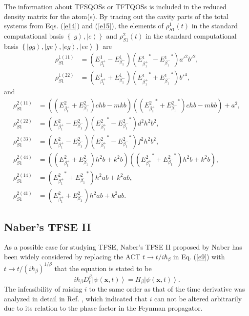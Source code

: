 \documentclass[
showpacs,  %
showkeys,  %
aps,       %
amsthm,    %
amsmath,   %
amsfonts,  %
amssymb    %
]{revtex4-1}          %
\begin{document}
The information about TFSQOSs or TFTQOSs is included in the reduced density matrix for the atom(s). By tracing out the cavity parts of the total systems from Eqs. (\ref{e14}) and (\ref{e15}), the elements of ${\rho^1_{S1}(t)}$ in the standard computational basis $\left\{{\left|g\right\rangle,\left|e\right\rangle}\right\}$ and ${\rho^2_{S1}(t)}$ in the standard computational basis $\left\{ {\left|{gg}\right\rangle,\left|{ge}\right\rangle,\left|{eg} \right\rangle,\left|{ee}\right\rangle}\right\}$ are
\begin{equation}
\label{e17}
\begin{aligned}
{\rho_{S1}^{1(11)}} &= (E_{\beta_1^ + }^1 - E_{\beta_1^ - }^1)({E{_{\beta _1^ + }^1}^*} - {E{_{\beta _1^ - }^1}^*}){a'}^2{b'}^2,\\
{\rho_{S1}^{1(22)}} &= (E_{\beta_1^ + }^1 + E_{\beta_1^ - }^1)({E{_{\beta _1^ + }^1}^*} + {E{_{\beta _1^ - }^1}^*}){b'}^4,
\end{aligned}
\end{equation}
and
\begin{equation}
\label{e18}
\begin{aligned}
{\rho_{S1}^{2(11)}}&=(({E_{\beta_1^ +}^2}+{E_{\beta_1^ -}^2})chb-mkb)(({{E_{\beta_1^ + }^2}^*} + {{E_{\beta_1^ - }^2}^*})chb-mkb)+ {a^2},\\
{\rho_{S1}^{2(22)}}&=({E_{\beta_1^ +}^2}-{E_{\beta_1^ -}^2})({{E_{\beta_1^ + }^2}^*} - {{E_{\beta_1^ - }^2}^*}){d^2}{h^2}{b^2},\\
{\rho_{S1}^{2(33)}}&=({E_{\beta_1^ +}^2}-{E_{\beta_1^ -}^2})({{E_{\beta_1^ + }^2}^*} - {{E_{\beta_1^ - }^2}^*}){f^2}{h^2}{b^2},\\
{\rho_{S1}^{2(44)}}&=(({E_{\beta_1^ +}^2}+{E_{\beta_1^ -}^2}){h^2}b+{k^2}b)(({{E_{\beta_1^ + }^2}^*} + {{E_{\beta_1^ - }^2}^*}){h^2}b +{k^2}b),\\
{\rho_{S1}^{2(14)}}&=({{E_{\beta_1^ + }^2}^*} + {{E_{\beta_1^ - }^2}^*}){h^2}ab+{k^2}ab,\\
{\rho_{S1}^{2(41)}}&=({E_{\beta_1^ +}^2}+{E_{\beta_1^ -}^2}){h^2}ab+{k^2}ab.
\end{aligned}
\end{equation}

\subsection{Naber's TFSE II}
\label{subsec:32}
As a possible case for studying TFSE, Naber's TFSE II proposed by Naber \cite{Naber2004} has been widely considered by replacing the ACT $t\to t/i\hbar_\beta$ in Eq. (\ref{e9}) with $t\to t/{(i\hbar_\beta)^{1/\beta}}$ that the equation is stated to be
\begin{equation}
\label{e19}
{i\hbar_\beta}D_t^\beta \left| {\psi (\boldsymbol{x},t)} \right\rangle= {H_\beta }\left| {\psi (\boldsymbol{x},t)} \right\rangle.
\end{equation}
The infeasibility of raising $i$ to the same order as that of the time derivative was analyzed in detail in Ref. \cite{Achar2013}, which indicated that $i$ can not be altered arbitrarily due to its relation to the phase factor in the Feynman propagator.
\end{document}
